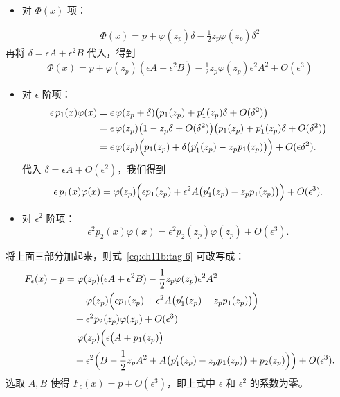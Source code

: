 \begin{itemize}
\tightlist
\item
  对 $\Phi(x)$ 项：
\end{itemize}
\[\begin{aligned} \Phi(x)=p+\varphi(z_p)\delta - \frac12 z_p \varphi(z_p)\delta^2  \end{aligned}\]
再将 $\delta = \epsilon A + \epsilon^2 B$ 代入，得到
\[\begin{aligned} \Phi(x)=p+ \varphi(z_p)(\epsilon A + \epsilon^2 B)-\frac12 z_p\varphi(z_p) \epsilon^2 A^2 + O(\epsilon^3) \end{aligned}\]
\begin{itemize}
\tightlist
\item
  对 $\epsilon$ 阶项：
  \[  \begin{aligned} \epsilon\, p_1(x)\varphi(x) &= \epsilon\, \varphi(z_p+\delta)\bigl(p_1(z_p)+p_1'(z_p)\delta + O(\delta^2)\bigr) \\ &= \epsilon\,\varphi(z_p)\bigl(1 - z_p\delta + O(\delta^2)\bigr) \bigl(p_1(z_p)+p_1'(z_p)\delta + O(\delta^2)\bigr) \\ &= \epsilon\,\varphi(z_p)\Bigl( p_1(z_p) + \delta\bigl(p_1'(z_p)-z_p p_1(z_p)\bigr) \Bigr) + O(\epsilon\delta^2). \end{aligned}
  \]  代入 $\delta = \epsilon A+O(\epsilon^2)$，我们得到
  \[  \epsilon\, p_1(x)\varphi(x) = \varphi(z_p)\Bigl( \epsilon p_1(z_p) + \epsilon^2 A\bigl(p_1'(z_p)-z_p p_1(z_p)\bigr) \Bigr) + O(\epsilon^3).
  \]\item
  对 $\epsilon^2$ 阶项：
  \[
  \epsilon^2 p_2(x)\varphi(x) = \epsilon^2 p_2(z_p)\varphi(z_p) + O(\epsilon^3).
  \]
\end{itemize}

将上面三部分加起来，则式~\eqref{eq:ch11b:tag-6} 可改写成：
\[\begin{aligned} F_\epsilon(x) - p &= \varphi(z_p)(\epsilon A + \epsilon^2 B)-\frac12 z_p\varphi(z_p) \epsilon^2 A^2 \\ &\quad + \varphi(z_p)\Bigl( \epsilon p_1(z_p) + \epsilon^2 A\bigl(p_1'(z_p)-z_p p_1(z_p)\bigr) \Bigr) \\ &\quad + \epsilon^2 p_2(z_p)\varphi(z_p) + O(\epsilon^3)\\ &= \varphi(z_p)\Bigl( \epsilon\bigl(A + p_1(z_p)\bigr) \\ &\quad +\epsilon^2\Bigl( B - \frac12 z_p A^2 + A\bigl(p_1'(z_p)-z_p p_1(z_p)\bigr) + p_2(z_p) \Bigr) \Bigr) + O(\epsilon^3). \end{aligned}\]选取 $A,B$ 使得 $F_\epsilon(x)=p+O(\epsilon^3)$，即上式中 $\epsilon$ 和 $\epsilon^2$ 的系数为零。

